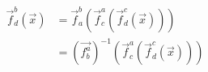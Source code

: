 \vbox{
  \begin{align*}
    \vec{f}_{d}^{b}(\vec{x}) & = \vec{f}_{a}^{b}(\vec{f}_{c}^{a}(\vec{f}_{d}^{c}(\vec{x}))) \\
                             & = {(\vec{{f}_{b}^{a}})}^{-1}(\vec{f}_{c}^{a}(\vec{f}_{d}^{c}(\vec{x})))
  \end{align*}
}
